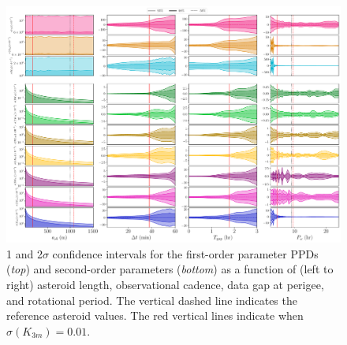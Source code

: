 \documentclass[fleqn,usenatbib]{mnras}
\begin{document}
\begin{figure}
  \newpage
  \centering
  \includegraphics[angle=90, origin=c, width=\linewidth]{figs/scan-all2.pdf}
  \caption{1 and 2$\sigma$ confidence intervals for the first-order parameter PPDs (\textit{top}) and second-order parameters (\textit{bottom}) as a function of (left to right) asteroid length, observational cadence, data gap at perigee, and rotational period. The vertical dashed line indicates the reference asteroid values. The red vertical lines indicate when $\sigma(K_{3m}) =0.01$.}
    \label{fig:scan-rho}
    \label{fig:scan-theta}
    \label{fig:scan-cadence}
    \label{fig:observation-gap}
    \label{fig:scan-observational}
\end{figure}
\end{document}
